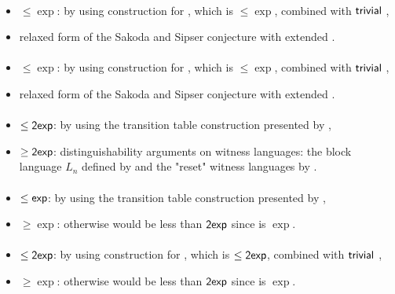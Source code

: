 \paragraph{\ONFA{}\tto\ODLA}
\begin{itemize}
	\item $\le\exp$: by using construction for \hyperref[cost:1NFAto1DFA]{\ONFA{}\tto\ODFA}, which is $\le\exp$, combined with $\mathsf{trivial}$ \ODFA{}\tto\ODLA,
	\item relaxed form of the Sakoda and Sipser conjecture with extended \TDFA.
\end{itemize}
\paragraph{\TNFA{}\tto\ODLA}
\begin{itemize}
	\item $\le\exp$: by using construction for \hyperref[cost:2NFAto1DFA]{\TNFA{}\tto\ODFA}, which is $\le\exp$, combined with $\mathsf{trivial}$ \ODFA{}\tto\ODLA,
	\item relaxed form of the Sakoda and Sipser conjecture with extended \TDFA.
\end{itemize}
\paragraph{\OLA{}\tto\ODFA}\label{cost:1LAto1DFA}
\begin{itemize}
	\item $\le\mathsf{2exp}$: by using the transition table construction presented by ,
	\item $\ge\mathsf{2exp}$: distinguishability arguments on witness languages: the block language $L_n$ defined by  and the "reset" witness languages by .
\end{itemize}
\paragraph{\OLA{}\tto\ONFA}\label{cost:1LAto1NFA}
\begin{itemize}
	\item $\le\mathsf{exp}$: by using the transition table construction presented by ,
	\item $\ge\exp$: otherwise \hyperref[cost:1LAto1DFA]{\OLA{}\tto\ODFA} would be less than $\mathsf{2exp}$ since \hyperref[cost:1NFAto1DFA]{\ONFA{}\tto\ODFA} is $\exp$.
\end{itemize}
\paragraph{\OLA{}\tto\TDFA}
\begin{itemize}
	\item $\le\mathsf{2exp}$: by using construction for \hyperref[cost:1LAto1DFA]{\OLA{}\tto\ODFA}, which is $\le\mathsf{2exp}$, combined with $\mathsf{trivial}$ \ODFA{}\tto\TDFA,
	\item $\ge\exp$: otherwise \hyperref[cost:1LAto1DFA]{\OLA{}\tto\ODFA} would be less than $\mathsf{2exp}$ since \hyperref[cost:2DFAto1DFA]{\TDFA{}\tto\ODFA} is $\exp$.
\end{itemize}
